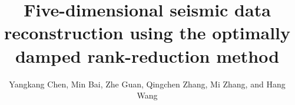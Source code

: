 
\title{Five-dimensional seismic data reconstruction using the optimally damped rank-reduction method}
\author{Yangkang Chen\footnotemark[1], Min Bai\footnotemark[1], Zhe Guan\footnotemark[2], Qingchen Zhang\footnotemark[1], Mi Zhang\footnotemark[3], and Hang Wang\footnotemark[1]}

\renewcommand{\thefootnote}{\fnsymbol{footnote}}



\address{
\footnotemark[1]
School of Earth Sciences\\
Zhejiang University\\
Hangzhou, Zhejiang Province, China, 310027\\
yangkang.chen@zju.edu.cn \\
\footnotemark[2]
Applied Physics Program\\
Rice University\\
Houston, TX, USA\\
Zhe.Guan@rice.edu\\
\footnotemark[3]State Key Laboratory of Petroleum Resources and Prospecting \\
China University of Petroleum \\
Fuxue Road 18th\\
Beijing, China, 102200 \\
cupmi@sina.com \\
}


